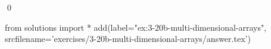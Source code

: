 
\begin{ex} 
  \label{ex:3-20b-multi-dimensional-arrays}
  
  \qed
\end{ex} 
\begin{python0}
from solutions import *
add(label="ex:3-20b-multi-dimensional-arrays",
    srcfilename='exercises/3-20b-multi-dimensional-arrays/answer.tex') 
\end{python0}
